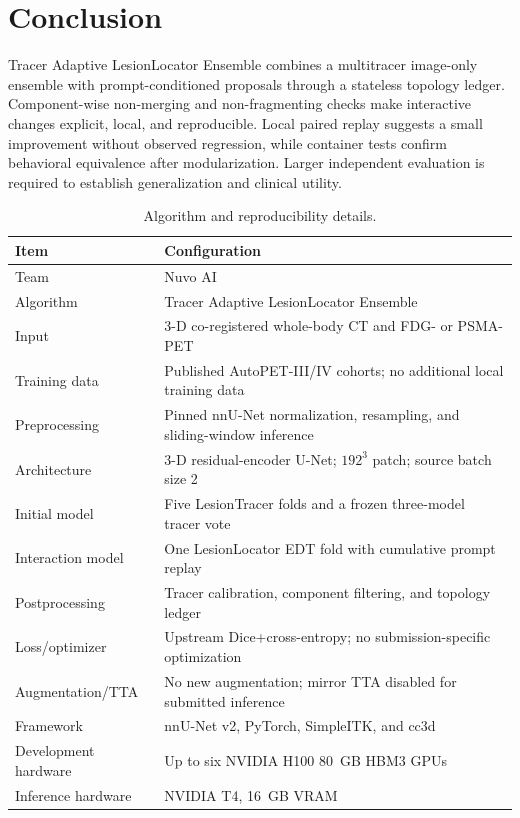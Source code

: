 \documentclass[runningheads]{llncs}
\begin{document}
\section{Conclusion}

Tracer Adaptive LesionLocator Ensemble combines a multitracer image-only
ensemble with prompt-conditioned proposals through a stateless topology
ledger. Component-wise non-merging and non-fragmenting checks make interactive
changes explicit, local, and reproducible. Local paired replay suggests a
small improvement without observed regression, while container tests confirm
behavioral equivalence after modularization. Larger independent evaluation is
required to establish generalization and clinical utility.

\begin{table}[t]
\caption{Algorithm and reproducibility details.}
\label{tab:details}
\small
\centering
\setlength{\tabcolsep}{5pt}
\begin{tabular}{P{0.27\textwidth}P{0.64\textwidth}}
\toprule
Item & Configuration \\
\midrule
Team & Nuvo AI \\
Algorithm & Tracer Adaptive LesionLocator Ensemble \\
Input & 3-D co-registered whole-body CT and FDG- or PSMA-PET \\
Training data & Published AutoPET-III/IV cohorts; no additional local training data \\
Preprocessing & Pinned nnU-Net normalization, resampling, and sliding-window inference \\
Architecture & 3-D residual-encoder U-Net; $192^3$ patch; source batch size 2 \\
Initial model & Five LesionTracer folds and a frozen three-model tracer vote \\
Interaction model & One LesionLocator EDT fold with cumulative prompt replay \\
Postprocessing & Tracer calibration, component filtering, and topology ledger \\
Loss/optimizer & Upstream Dice+cross-entropy; no submission-specific optimization \\
Augmentation/TTA & No new augmentation; mirror TTA disabled for submitted inference \\
Framework & nnU-Net v2, PyTorch, SimpleITK, and cc3d \\
Development hardware & Up to six NVIDIA H100 80~GB HBM3 GPUs \\
Inference hardware & NVIDIA T4, 16~GB VRAM \\
\bottomrule
\end{tabular}
\end{table}
\end{document}
